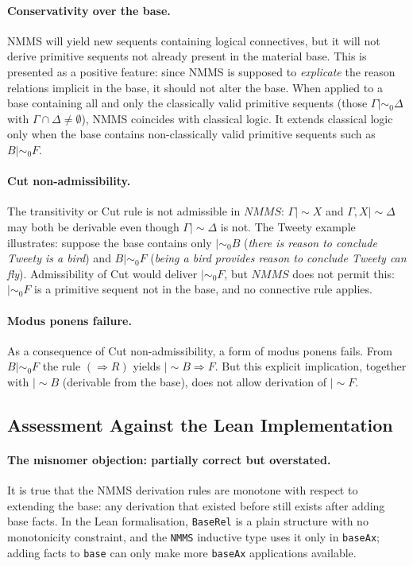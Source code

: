 \documentclass[a4paper,11pt]{report}
\newcommand{\ms}{\mathrel{\mid\!\sim}}
\newcommand{\mszero}{\mathrel{\mid\!\sim_{0}}}
\begin{document}
\paragraph{Conservativity over the base.}
NMMS will yield new sequents containing logical connectives, but it will not derive
primitive sequents not already present in the material base. This is presented as a
positive feature: since NMMS is supposed to \emph{explicate} the reason relations implicit
in the base, it should not alter the base.
When applied to a base containing all and only the classically valid primitive sequents
(those $\Gamma \mszero \Delta$ with $\Gamma \cap \Delta \neq \emptyset$), NMMS coincides
with classical logic. It extends classical logic only when the base contains non-classically
valid primitive sequents such as $B \mszero F$.

\paragraph{Cut non-admissibility.}
The transitivity or Cut rule is not admissible in $\mathit{NMMS}$:
$\Gamma \ms X$ and $\Gamma, X \ms \Delta$ may both be derivable even though
$\Gamma \ms \Delta$ is not.
The Tweety example illustrates: suppose the base contains only $\mszero B$
(\emph{there is reason to conclude Tweety is a bird}) and $B \mszero F$
(\emph{being a bird provides reason to conclude Tweety can fly}).
Admissibility of Cut would deliver $\mszero F$, but $\mathit{NMMS}$ does not permit this:
$\mszero F$ is a primitive sequent not in the base, and no connective rule applies.

\paragraph{Modus ponens failure.}
As a consequence of Cut non-admissibility, a form of modus ponens fails. From $B \mszero F$
the rule $(\Rightarrow R)$ yields $\ms B \Rightarrow F$. But this explicit implication,
together with $\ms B$ (derivable from the base), does not allow derivation of $\ms F$.

\subsection*{Assessment Against the Lean Implementation}

\paragraph{The misnomer objection: partially correct but overstated.}
It is true that the NMMS derivation rules are monotone with respect to extending the base:
any derivation that existed before still exists after adding base facts.
In the Lean formalisation, \texttt{BaseRel} is a plain structure with no monotonicity
constraint, and the \texttt{NMMS} inductive type uses it only in \texttt{baseAx}; adding
facts to \texttt{base} can only make more \texttt{baseAx} applications available.
\end{document}
